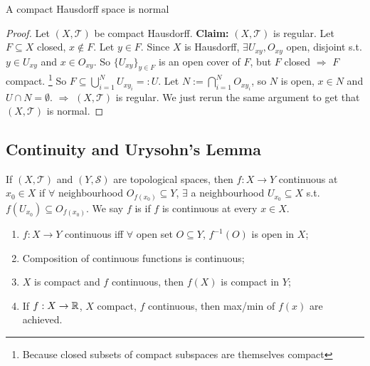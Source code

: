 \begin{thm}
    A compact Hausdorff space is normal
\end{thm}

\begin{proof}
    Let $(X, \mathcal{T})$ be compact Hausdorff. 
    \newline \noindent \textbf{Claim:} $(X, \mathcal{T})$ is regular.
    \newline \noindent Let $F \subseteq X$ closed, $x \notin F$. Let $y \in F$. Since $X$ is 
    Hausdorff, $\exists U_{xy}, O_{xy}$ open, disjoint s.t. $y \in U_{xy}$ and $x \in O_{xy}$.
    So $\{U_{xy}\}_{y \in F}$ is an open cover of $F$, but $F$ closed $\Rightarrow$ $F$ compact.
    \footnote{Because closed subsets of compact subspaces are themselves compact} 
    So $F \subseteq \bigcup_{ i = 1}^N U_{x y_i} =: U$. Let $N := \bigcap_{i = 1}^N O_{x y_i}$,
    so $N$ is open, $x \in N$ and $U \cap N = \emptyset$. $\Rightarrow$ $(X, \mathcal{T})$ is regular.
    We just rerun the same argument to get that $(X, \mathcal{T})$ is normal.             
\end{proof}

\subsection{Continuity and Urysohn's Lemma}

\begin{defn} 
    If $(X, \mathcal{T})$ and $(Y, \mathcal{S})$ are topological spaces, then $f : X \to Y$ continuous
    at $x_0 \in X$ if $\forall $ neighbourhood $O_{f(x_0)} \subseteq Y$, $\exists $ a neighbourhood
    $U_{x_0} \subseteq X$ s.t. $f(U_{x_0}) \subseteq O_{f(x_0)}$. We say $f$ is  if
    $f$ is continuous at every $x \in X$.        
\end{defn}


\begin{prop}
    \begin{enumerate}
        \item $f : X \to Y$ continuous iff $\forall $ open set $O \subseteq Y$, $f^{-1}(O)$ is open in $X$;
        \item Composition of continuous functions is continuous;
        \item $X$ is compact and $f$ continuous, then $f(X)$ is compact in $Y$;
        \item If $f: X \to \mathbb{R}$, $X$ compact, $f$ continuous, then max/min of $f(x)$ are achieved.           
    \end{enumerate}
\end{prop}

